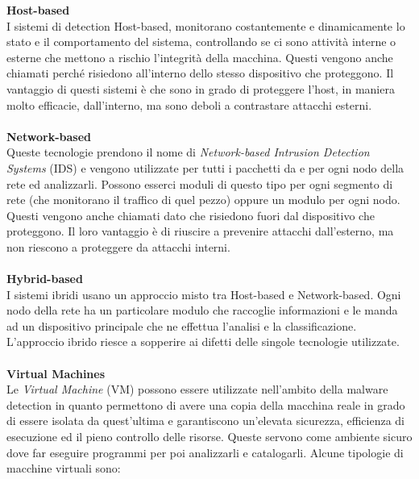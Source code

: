\textbf{Host-based}\\
I sistemi di detection Host-based, monitorano costantemente e dinamicamente lo stato e il comportamento del sistema, controllando se ci sono attività interne o esterne che mettono a rischio l'integrità della macchina. Questi vengono anche chiamati  perché risiedono all'interno dello stesso dispositivo che proteggono.
Il vantaggio di questi sistemi è che sono in grado di proteggere l'host, in maniera molto efficacie, dall'interno, ma sono deboli a contrastare attacchi esterni.\\
\\
\textbf{Network-based}\\
Queste tecnologie prendono il nome di \textit{Network-based Intrusion Detection Systems} (IDS) e vengono utilizzate per  tutti i pacchetti da e per ogni nodo della rete ed analizzarli. Possono esserci moduli di questo tipo per ogni segmento di rete (che monitorano il traffico di quel pezzo) oppure un modulo per ogni nodo. Questi vengono anche chiamati  dato che risiedono fuori dal dispositivo che proteggono. Il loro vantaggio è di riuscire a prevenire attacchi dall'esterno, ma non riescono a proteggere da attacchi interni.\\
\\
\textbf{Hybrid-based}\\
I sistemi ibridi usano un approccio misto tra Host-based e Network-based. Ogni nodo della rete ha un particolare modulo che raccoglie informazioni e le manda ad un dispositivo principale che ne effettua l'analisi e la classificazione. L'approccio ibrido riesce a sopperire ai difetti delle singole tecnologie utilizzate.\\
\\
\textbf{Virtual Machines}\\
Le \textit{Virtual Machine} (VM) possono essere utilizzate nell'ambito della malware detection in quanto permettono di avere una copia della macchina reale in grado di essere isolata da quest'ultima e garantiscono un'elevata sicurezza, efficienza di esecuzione ed il pieno controllo delle risorse. Queste servono come ambiente sicuro dove far eseguire programmi per poi analizzarli e catalogarli. Alcune tipologie di macchine virtuali sono:

